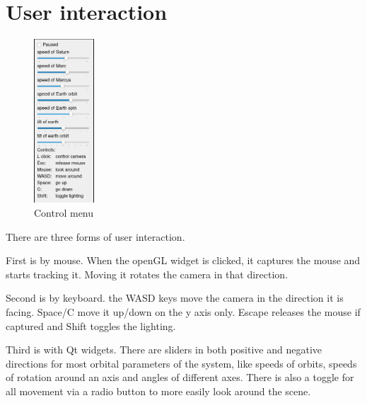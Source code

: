 \documentclass[10pt]{article}
\begin{document}
    \pagebreak
    \section{User interaction}

        \begin{figure}
            \caption{Control menu}
            \includegraphics[width=0.2\textwidth]{controls}
        \end{figure}

        There are three forms of user interaction.

        First is by mouse. When the openGL widget is clicked, it captures the
        mouse and starts tracking it. Moving it rotates the camera in that direction.

        Second is by keyboard. the WASD keys move the camera in the direction
        it is facing. Space/C move it up/down on the y axis only. Escape
        releases the mouse if captured and Shift toggles the lighting.

        Third is with Qt widgets. There are sliders in both positive and
        negative directions for most orbital parameters of the system, like
        speeds of orbits, speeds of rotation around an axis and angles of
        different axes. There is also a toggle for all movement via a radio
        button to more easily look around the scene.
\end{document}
